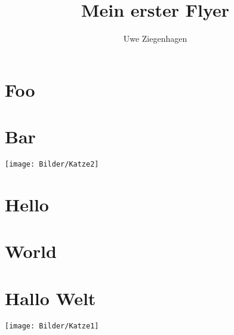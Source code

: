 \documentclass[12pt,ngerman]{leaflet}
\author{Uwe Ziegenhagen}
\title{Mein erster Flyer}
\begin{document}
\maketitle
\thispagestyle{empty}

\section{Foo}

\blindtext[2]

\section{Bar}

\texttt{[image: Bilder/Katze2]}

\blindtext

\section{Hello}

\blindtext[4]

\section{World}

\blindtext

\section{Hallo Welt}

\blindtext

\texttt{[image: Bilder/Katze1]}
\end{document}
